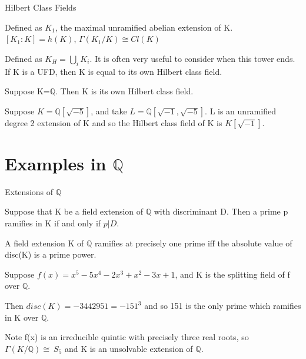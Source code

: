 \documentclass[10pt]{beamer}
\theoremstyle{plain} %
\begin{document}
\begin{frame}{Hilbert Class Fields}
\pause

\begin{definition}
Defined as $K_1$, the maximal unramified abelian extension of K. $[K_1:K]=h(K)$, $\Gamma(K_1/K)\cong Cl(K)$
\end{definition}
\pause
  \begin{definition}
Defined as $K_H=\bigcup_{i}K_{i}$. It is often very useful to consider when this tower ends. If K is a UFD, then K is equal to its own Hilbert class field.  
\end{definition}
\pause

    \begin{example}
    Suppose K=$\mathbb{Q}$. Then K is its own Hilbert class field. 
\end{example}
\pause
\begin{example}
    Suppose $K=\mathbb{Q}[\sqrt{-5}]$, and take $L=\mathbb{Q}[\sqrt{-1},\sqrt{-5}]$. L is an unramified degree 2 extension of K and so the Hilbert class field of K is $K[\sqrt{-1}]$.
\end{example}

\end{frame}

\section{Examples in $\mathbb{Q}$}

\begin{frame}{Extensions of $\mathbb{Q}$}
\pause

    \begin{theorem}
     Suppose that K be a field extension of $\mathbb{Q}$ with discriminant D. Then a prime p
ramifies in K if and only if $p|D$.   
    \end{theorem}
    \pause

    \begin{corollary}
A field extension K of $\mathbb{Q}$ ramifies at precisely one prime iff the absolute value of disc(K) is a prime power.
\end{corollary}
\pause

\begin{example}
    Suppose $f(x)=x^5-5x^4-2x^3+x^2-3x+1$, and K is the splitting field of f over $\mathbb{Q}$. \par Then $disc(K)=-3442951=-151^3$ and so 151 is the only prime which ramifies in K over $\mathbb{Q}$. \par Note f(x) is an irreducible quintic with precisely three real roots, so $\Gamma(K/\mathbb{Q})\cong\ S_5$ and K is an unsolvable extension of $\mathbb{Q}$.
\end{example}
\end{frame}
\end{document}

